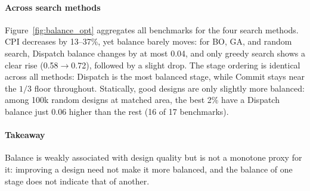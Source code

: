 \paragraph{Across search methods}
Figure~\ref{fig:balance_opt} aggregates all benchmarks for the four search methods.
%
CPI decreases by 13--37\%, yet balance barely moves: for BO, GA, and random search, Dispatch balance changes by at most 0.04, and only greedy search shows a clear rise (0.58$\rightarrow$0.72), followed by a slight drop.
%
The stage ordering is identical across all methods: Dispatch is the most balanced stage, while Commit stays near the $1/3$ floor throughout.
%
Statically, good designs are only slightly more balanced: among 100k random designs at matched area, the best 2\% have a Dispatch balance just 0.06 higher than the rest (16 of 17 benchmarks).

\paragraph{Takeaway}
Balance is weakly associated with design quality but is not a monotone proxy for it: improving a design need not make it more balanced, and the balance of one stage does not indicate that of another.
